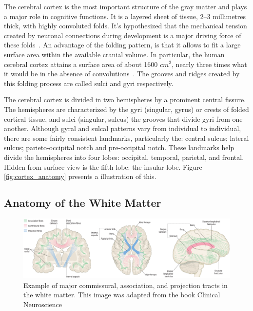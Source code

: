 The cerebral cortex is the most important structure of the gray matter and
plays a major role in cognitive functions. It is a layered sheet of tissue,
2–3 millimetres thick, with highly convoluted folds. It's hypothesized that the
mechanical tension created by neuronal connections during development is a major
driving force of these folds~\cite{VanEssen1997}. An advantage of the folding
pattern, is that it allows to fit a large surface area within the available
cranial volume. In particular, the human cerebral cortex attains a surface area
of about 1600 $cm^2$, nearly three times what it would be in the absence of
convolutions~\cite{VanEssen1997}. The grooves and ridges created by this folding
process are called sulci and gyri respectively.

The cerebral cortex is divided in two hemispheres by a prominent central fissure.
The hemispheres are characterized by the gyri (singular, gyrus) or crests of
folded cortical tissue, and sulci (singular, sulcus) the grooves that divide
gyri from one another. Although gyral and sulcal patterns vary from individual
to individual, there are some fairly consistent landmarks, particularly the: 
central sulcus; lateral sulcus; parieto-occipital notch and pre-occipital notch.
These landmarks help divide the hemispheres into four lobes: occipital, 
temporal, parietal, and frontal. Hidden from surface view is the fifth lobe:
the insular lobe. Figure \ref{fig:cortex_anatomy} presents a illustration of this.

\subsection{Anatomy of the White Matter}

\begin{figure}[t]
    \includegraphics[width=\textwidth]{2.neuroanatomy/img/tracts.png}
    \caption{Example of major commissural, association, and projection tracts
             in the white matter. This image was adapted from the book Clinical
             Neuroscience~\cite{Johns}}
    \label{fig:white_anatomy}
\end{figure}

